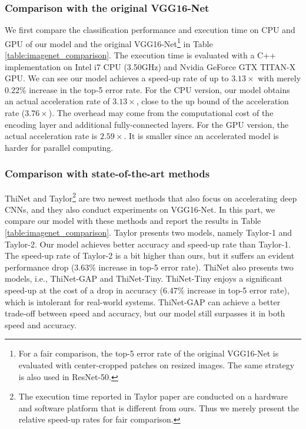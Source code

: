 \documentclass[letterpaper]{article} %
\begin{document}
\subsubsection{Comparison with the original VGG16-Net}
We first compare the classification performance and execution time on CPU and GPU of our model and the original VGG16-Net\footnote{For a fair comparison, the top-5 error rate of the original VGG16-Net is evaluated with center-cropped patches on resized images. The same strategy is also used in ResNet-50.} in Table \ref{table:imagenet_comparison}. The execution time is evaluated with a C++ implementation on Intel i7 CPU (3.50GHz) and Nvidia GeForce GTX TITAN-X GPU. We can see our model achieves a speed-up rate of up to $3.13\times$ with merely 0.22\% increase in the top-5 error rate. For the CPU version, our model obtains an actual acceleration rate of $3.13\times$, close to the up bound of the acceleration rate ($3.76\times$). The overhead may come from the computational cost of the encoding layer and additional fully-connected layers. For the GPU version, the actual acceleration rate is $2.59\times$. It is smaller since an accelerated model is harder for parallel computing.

\subsubsection{Comparison with state-of-the-art methods}
ThiNet \cite{luo2017thinet} and Taylor\footnote{The execution time reported in Taylor paper are conducted on a hardware and software platform that is different from ours. Thus we merely present the relative speed-up rates for fair comparison.} \cite{molchanov2016pruning} are two newest methods that also focus on accelerating deep CNNs, and they also conduct experiments on VGG16-Net. In this part, we compare our model with these methods and report the results in Table \ref{table:imagenet_comparison}. Taylor presents two models, namely Taylor-1 and Taylor-2. Our model achieves better accuracy and speed-up rate than Taylor-1. The speed-up rate of Taylor-2 is a bit higher than ours, but it suffers an evident performance drop (3.63\% increase in top-5 error rate). ThiNet also presents two models, i.e., ThiNet-GAP and ThiNet-Tiny. ThiNet-Tiny enjoys a significant speed-up at the cost of a drop in accuracy (6.47\% increase in top-5 error rate), which is intolerant for real-world systems. ThiNet-GAP can achieve a better trade-off between speed and accuracy, but our model still surpasses it in both speed and accuracy. 
\end{document}
